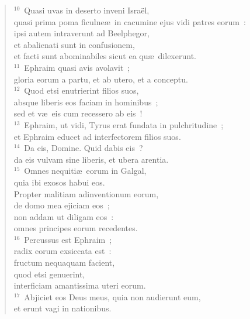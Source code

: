 \begin{verse}
${}^{10}$~Quasi uvas in deserto inveni Isra\"el,\\ quasi prima poma ficulne\ae\ in cacumine ejus vidi patres eorum~:\\ ipsi autem intraverunt ad Beelphegor,\\ et abalienati sunt in confusionem,\\ et facti sunt abominabiles sicut ea qu\ae\ dilexerunt.\\
${}^{11}$~Ephraim quasi avis avolavit~;\\ gloria eorum a partu, et ab utero, et a conceptu.\\
${}^{12}$~Quod etsi enutrierint filios suos,\\ absque liberis eos faciam in hominibus~;\\ sed et v\ae\ eis cum recessero ab eis~!\\
${}^{13}$~Ephraim, ut vidi, Tyrus erat fundata in pulchritudine~;\\ et Ephraim educet ad interfectorem filios suos.\\
${}^{14}$~Da eis, Domine. Quid dabis eis~?\\ da eis vulvam sine liberis, et ubera arentia.\\
${}^{15}$~Omnes nequiti\ae\ eorum in Galgal,\\ quia ibi exosos habui eos.\\ Propter malitiam adinventionum eorum,\\ de domo mea ejiciam eos~;\\ non addam ut diligam eos~:\\ omnes principes eorum recedentes.\\
${}^{16}$~Percussus est Ephraim~;\\ radix eorum exsiccata est~:\\ fructum nequaquam facient,\\ quod etsi genuerint,\\ interficiam amantissima uteri eorum.\\
${}^{17}$~Abjiciet eos Deus meus, quia non audierunt eum,\\ et erunt vagi in nationibus.\end{verse}



